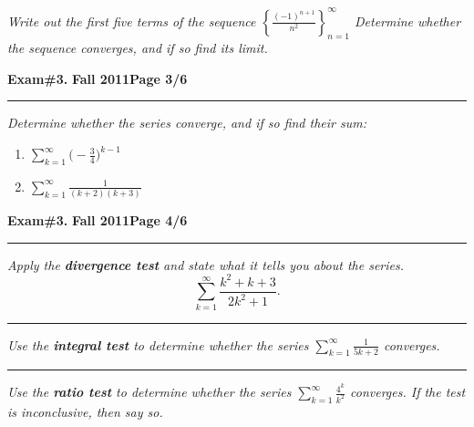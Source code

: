 \documentclass[12pt]{article}
\begin{document}
{\problem[10pts] \em Write out the first five terms of the sequence $\left\{ \displaystyle{\frac{(-1)^{n+1}}{n^2}} \right\}_{n=1}^\infty$ \newline Determine whether the sequence converges, and if so find its limit.
\vspace{7cm}
\begin{flushright}
\end{flushright}
\newpage


\hfill{\large\bf Exam\#3.}\hfill{\large\bf
  Fall 2011}\hfill{\large\bf Page 3/6}\hrule

\bigskip
{\problem[20 pts] \em Determine whether the series converge, and if so find their sum:}
\begin{enumerate}
\item $\displaystyle{\sum_{k=1}^\infty \Big( -\frac{3}{4} \Big)^{k-1}}$
\vspace{7cm}
\begin{flushright}
\end{flushright}
\item $\displaystyle{\sum_{k=1}^\infty \frac{1}{(k+2)(k+3)}}$
\vspace{7cm}
\begin{flushright}
\end{flushright}
\end{enumerate}
\newpage

\hfill{\large\bf Exam\#3.}\hfill{\large\bf
  Fall 2011}\hfill{\large\bf Page 4/6}\hrule

\bigskip
{\problem[5 pts] \em Apply the \textbf{divergence test} and state what it tells you about the series.}
\begin{equation*}
\sum_{k=1}^\infty \frac{k^2+k+3}{2k^2+1}.
\end{equation*}
\vspace{2cm}
\hrule
{\problem[10 pts] \em Use the \textbf{integral test} to determine whether the series $\displaystyle{\sum_{k=1}^\infty \frac{1}{5k+2}}$ converges.}
\vspace{6.5cm}
\hrule
{\problem[10 pts] \em Use the \textbf{ratio test} to determine whether the series $\displaystyle{\sum_{k=1}^\infty \frac{4^k}{k^2}}$ converges.  If the test is inconclusive, then say so.}
\newpage

}
\end{document}
